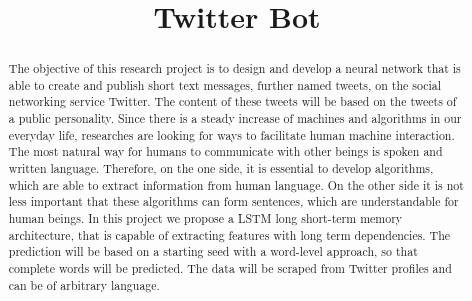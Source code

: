 \documentclass[conference]{IEEEtran}
\begin{document}
\title{Twitter Bot}

\author{
\and
{}
\and
{}
}

\maketitle

\begin{abstract}
The objective of this research project is to design and develop a neural network that is able to create and publish short text messages, further named tweets, on the social networking service Twitter. The content of these tweets will be based on the tweets of a public personality. Since there is a steady increase of machines and algorithms in our everyday life, researches are looking for ways to facilitate human machine interaction. The most natural way for humans to communicate with other beings is spoken and written language. Therefore, on the one side, it is essential to develop algorithms, which are able to extract information from human language. On the other side it is not less important that these algorithms can form sentences, which are understandable for human beings. In this project we propose a LSTM long short-term memory architecture, that is capable of extracting features with long term dependencies. The prediction will be based on a  starting seed with a word-level approach, so that complete words will be predicted. The data will be scraped from Twitter profiles and can be of arbitrary language. 
\end{abstract}
\end{document}
